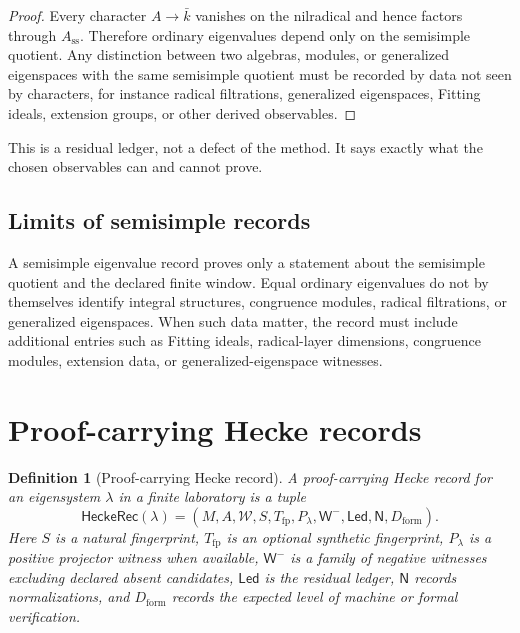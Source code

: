 \documentclass[11pt]{article}
\newtheorem{definition}[theorem]{Definition}
\begin{document}
\begin{proof}
Every character \(A\to \bar k\) vanishes on the nilradical and hence factors through \(A_{\mathrm{ss}}\).  Therefore ordinary eigenvalues depend only on the semisimple quotient.  Any distinction between two algebras, modules, or generalized eigenspaces with the same semisimple quotient must be recorded by data not seen by characters, for instance radical filtrations, generalized eigenspaces, Fitting ideals, extension groups, or other derived observables.
\end{proof}

This is a residual ledger, not a defect of the method.  It says exactly what the chosen observables can and cannot prove.

\subsection{Limits of semisimple records}

A semisimple eigenvalue record proves only a statement about the semisimple quotient and the declared finite window.  Equal ordinary eigenvalues do not by themselves identify integral structures, congruence modules, radical filtrations, or generalized eigenspaces.  When such data matter, the record must include additional entries such as Fitting ideals, radical-layer dimensions, congruence modules, extension data, or generalized-eigenspace witnesses.

\section{Proof-carrying Hecke records}

\begin{definition}[Proof-carrying Hecke record]
A proof-carrying Hecke record for an eigensystem \(\lambda\) in a finite laboratory is a tuple
\[
\mathsf{HeckeRec}(\lambda)=
(M,A,\mathcal W,S,T_{\mathrm{fp}},P_\lambda,\mathsf W^-,
\mathsf{Led},\mathsf N,D_{\mathrm{form}}).
\]
Here \(S\) is a natural fingerprint, \(T_{\mathrm{fp}}\) is an optional synthetic fingerprint, \(P_\lambda\) is a positive projector witness when available, \(\mathsf W^-\) is a family of negative witnesses excluding declared absent candidates, \(\mathsf{Led}\) is the residual ledger, \(\mathsf N\) records normalizations, and \(D_{\mathrm{form}}\) records the expected level of machine or formal verification.
\end{definition}
\end{document}
